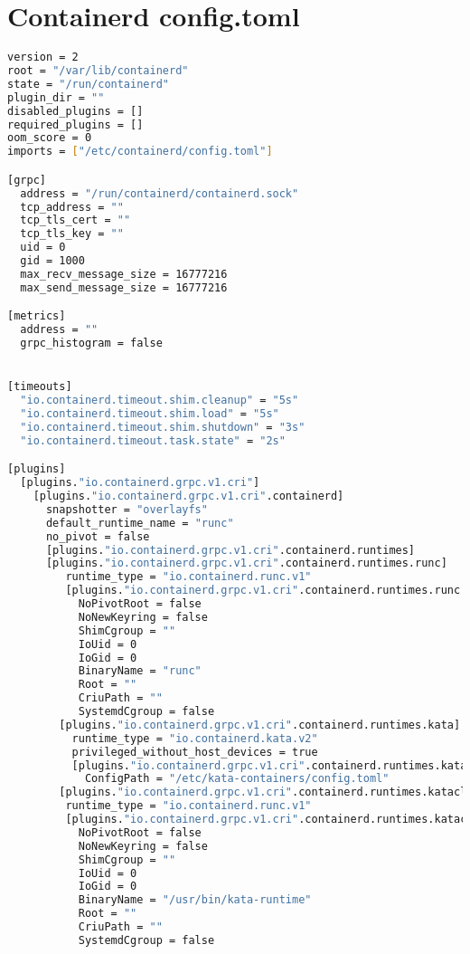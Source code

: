 \chapter{Containerd config.toml}
\label{app:containerd_config}
\begin{lstlisting}[language=bash, caption={config.toml}]
version = 2
root = "/var/lib/containerd"
state = "/run/containerd"
plugin_dir = ""
disabled_plugins = []
required_plugins = []
oom_score = 0
imports = ["/etc/containerd/config.toml"]

[grpc]
  address = "/run/containerd/containerd.sock"
  tcp_address = ""
  tcp_tls_cert = ""
  tcp_tls_key = ""
  uid = 0
  gid = 1000
  max_recv_message_size = 16777216
  max_send_message_size = 16777216

[metrics]
  address = ""
  grpc_histogram = false


[timeouts]
  "io.containerd.timeout.shim.cleanup" = "5s"
  "io.containerd.timeout.shim.load" = "5s"
  "io.containerd.timeout.shim.shutdown" = "3s"
  "io.containerd.timeout.task.state" = "2s"

[plugins]
  [plugins."io.containerd.grpc.v1.cri"]
    [plugins."io.containerd.grpc.v1.cri".containerd]
      snapshotter = "overlayfs"
      default_runtime_name = "runc"
      no_pivot = false
      [plugins."io.containerd.grpc.v1.cri".containerd.runtimes]
      [plugins."io.containerd.grpc.v1.cri".containerd.runtimes.runc]
         runtime_type = "io.containerd.runc.v1"
         [plugins."io.containerd.grpc.v1.cri".containerd.runtimes.runc.options]
           NoPivotRoot = false
           NoNewKeyring = false
           ShimCgroup = ""
           IoUid = 0
           IoGid = 0
           BinaryName = "runc"
           Root = ""
           CriuPath = ""
           SystemdCgroup = false
        [plugins."io.containerd.grpc.v1.cri".containerd.runtimes.kata]
          runtime_type = "io.containerd.kata.v2"
          privileged_without_host_devices = true
          [plugins."io.containerd.grpc.v1.cri".containerd.runtimes.kata.options]
            ConfigPath = "/etc/kata-containers/config.toml"
        [plugins."io.containerd.grpc.v1.cri".containerd.runtimes.katacli]
         runtime_type = "io.containerd.runc.v1"
         [plugins."io.containerd.grpc.v1.cri".containerd.runtimes.katacli.options]
           NoPivotRoot = false
           NoNewKeyring = false
           ShimCgroup = ""
           IoUid = 0
           IoGid = 0
           BinaryName = "/usr/bin/kata-runtime"
           Root = ""
           CriuPath = ""
           SystemdCgroup = false
\end{lstlisting}